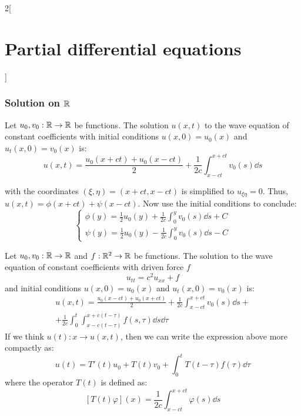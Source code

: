 \documentclass[../../../main_math.tex]{subfiles}
\begin{document}
\begin{multicols}{2}[\section{Partial differential equations}]
  \subsubsection{Solution on \texorpdfstring{$\mathbb{R}$}{R}}
  \begin{proposition}\label{PDE:propdAlembert}
    Let $u_0,v_0:\mathbb{R}\rightarrow\mathbb{R}$ be functions. The solution $u(x,t)$ to the wave equation of constant coefficients with initial conditions $u(x,0)=u_0(x)$ and $u_t(x,0)=v_0(x)$ is:
    \begin{equation}\label{PDE:dAlembert}
      u(x,t)=\frac{u_0(x+ct)+u_0(x-ct)}{2}+\frac{1}{2c}\int_{x-ct}^{x+ct}v_0(s)\dd{s}
    \end{equation}
  \end{proposition}
  \begin{sproof}
     with the coordinates $(\xi, \eta) = (x+ ct,x-ct)$ is simplified to $u_{\xi\eta}=0$. Thus, $u(x,t)=\phi(x+ct)+\psi(x-ct)$. Now use the initial conditions to conclude:
    $$
      \begin{cases}
        \displaystyle \phi(y)=\frac{1}{2}u_0(y)+\frac{1}{2c}\int_0^yv_0(s)\dd{s}+C \\
        \displaystyle \psi(y) = \frac{1}{2}u_0(y)-\frac{1}{2c}\int_0^yv_0(s)\dd{s}-C
      \end{cases}
    $$
  \end{sproof}
  \begin{theorem}
    Let $u_0,v_0:\mathbb{R}\rightarrow\mathbb{R}$ and $f:\mathbb{R}^2\rightarrow\mathbb{R}$ be functions. The solution to the wave equation of constant coefficients with driven force $f$
    \begin{equation}\label{PDE:waveeqdriven}
      u_{tt}=c^2 u_{xx} +f
    \end{equation}
    and initial conditions $u(x,0)=u_0(x)$ and $u_t(x,0)=v_0(x)$ is:
    \begin{multline*}
      u(x,t)=\frac{u_0(x-ct)+u_0(x+ct)}{2}+\frac{1}{2c}\int_{x-ct}^{x+ct}v_0(s)\dd{s}+\\+\frac{1}{2c}\int_0^t\int_{x-c(t-\tau)}^{x+c(t-\tau)}f(s,\tau)\dd{s}\dd{\tau}
    \end{multline*}
    If we think $u(t):x\rightarrow u(x,t)$, then we can write the expression above more compactly as: $$u(t)=T'(t)u_0+T(t)v_0+\int_0^tT(t-\tau) f(\tau)\dd{\tau}$$ where the operator $T(t)$ is defined as: $$\left[T(t)\varphi\right](x)=\frac{1}{2c}\int_{x-ct}^{x+ct}\varphi(s)\dd{s}$$
  \end{theorem}
  \begin{sproof}

\end{sproof}
\end{multicols}
\end{document}
